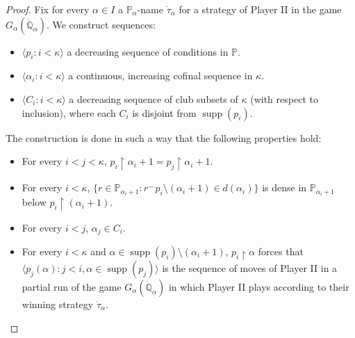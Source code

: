 \documentclass[11pt]{amsart}
\renewcommand{\restriction}{\mathbin\upharpoonright}    %
\theoremstyle{definition}
\newcounter{condition}
\theoremstyle{remark}
\newcommand\<{{<}}
\DeclareMathOperator{\supp}{supp}
\newcommand{\po}{\mathbb{P}}
\newcommand{\qo}{\mathbb{Q}}
\newcommand{\la}{\langle}
\newcommand{\ra}{\rangle}
\begin{document}
\begin{proof}
    Fix for every $\alpha\in I$ a $\po_\alpha$-name $\dot{\tau}_\alpha$ for a strategy of Player II in the game $G_{\alpha}( \dot{\qo}_\alpha)$.
    We construct sequences:
    \begin{itemize}
        \item $\la  p_i \colon i<\kappa\ra$ a decreasing  sequence of conditions in $\po$.
        \item $\la \alpha_i \colon i<\kappa \ra$ a continuous, increasing cofinal sequence in $\kappa$.
        \item $\la C_i \colon i<\kappa \ra$ a decreasing sequence of club subsets of $\kappa$ (with respect to inclusion), where each $C_i$ is disjoint from $\supp(p_i)$. 
    \end{itemize}
    The construction is done in such a way that the following properties hold:
    \begin{itemize}
        \item For every $i<j<\kappa$, $p_{i}\restriction \alpha_i+1 = p_j \restriction \alpha_i+1$.
        \item For every $i<\kappa$, $\{ r\in \po_{\alpha_{i}+1} \colon r^{\frown} p_{i}\setminus (\alpha_i+1) \in d(\alpha_i) \}$ is dense in $\po_{\alpha_i+1}$ below $p_i\restriction (\alpha_i+1)$.
        \item For every $i<j$, $\alpha_j \in C_i$. 
        \item For every $i<\kappa$ and $\alpha\in \supp(p_i)\setminus (\alpha_i+1)$, $p_i\restriction \alpha$ forces that $\la p_{j}(\alpha) \colon j<i, \alpha\in \supp(p_j) \ra$ is the sequence of moves of Player II in a partial run of the game $G_\alpha(\dot{\qo}_\alpha)$ in which Player II plays according to their winning strategy $\dot{\tau}_\alpha$.
    \end{itemize}
    

\end{proof}
\end{document}
